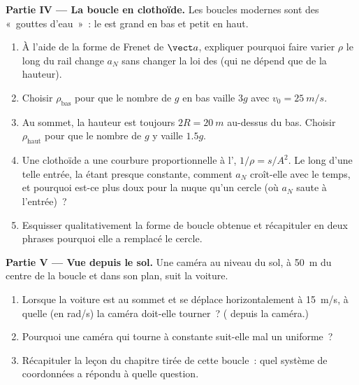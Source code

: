 \begin{problem}
\medskip
\noindent\textbf{Partie IV --- La boucle en clothoïde.}
Les boucles modernes sont des «~gouttes d'eau~»~: le 
est grand en bas et petit en haut.
\begin{enumerate}[resume]
  \item À l'aide de la forme de Frenet de $\vect a$, expliquer pourquoi
        faire varier $\rho$ le long du rail change $a_N$ sans changer la
        loi des  (qui ne dépend que de la hauteur).
  \item Choisir $\rho_{\text{bas}}$ pour que le nombre de $g$ en bas
        vaille $3g$ avec $v_0 = \qty{25}{m/s}$.
  \item Au sommet, la hauteur est toujours $2R = \qty{20}{m}$ au-dessus
        du bas. Choisir $\rho_{\text{haut}}$ pour que le nombre de
        $g$ y vaille $1.5g$.
  \item Une clothoïde a une courbure proportionnelle à l', $1/\rho = s/A^2$. Le long d'une telle entrée, la
         étant presque constante, comment $a_N$ croît-elle avec le
        temps, et pourquoi est-ce plus doux pour la nuque qu'un cercle
        (où $a_N$ saute à l'entrée)~?
  \item Esquisser qualitativement la forme de boucle obtenue et
        récapituler en deux phrases pourquoi elle a remplacé le cercle.
\end{enumerate}

\medskip
\noindent\textbf{Partie V --- Vue depuis le sol.}
Une caméra au niveau du sol, à \qty{50}{m} du centre de la boucle et
dans son plan, suit la voiture.
\begin{enumerate}[resume]
  \item Lorsque la voiture est au sommet et se déplace horizontalement à
        \qty{15}{m/s}, à quelle  (en rad/s) la caméra
        doit-elle tourner~? ( depuis la caméra.)
  \item Pourquoi une caméra qui tourne à  constante suit-elle mal
        un  uniforme~?
  \item Récapituler la leçon du chapitre tirée de cette boucle~: quel
        système de coordonnées a répondu à quelle question.
\end{enumerate}
\end{problem}
